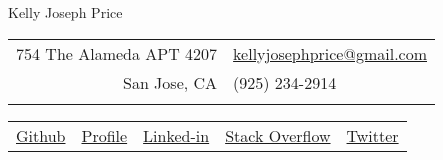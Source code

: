 \documentclass{article}
\begin{document}
\thispagestyle{empty} 

\center \huge{Kelly Joseph Price}
\normalsize

\hspace{.5cm}

{
    \footnotesize
    \centering
    \begin{tabular}{rl}
        754 The Alameda APT 4207\newline
        &
        \href{mailto:kellyjosephprice@gmail.com}{kellyjosephprice@gmail.com}\newline
        \\
        San Jose, CA
        &
        (925) 234-2914
        \\\\
    \end{tabular}
}

\begin{tabularx}{\textwidth}{CCCCC}
    \footnotesize
    \href{https://github.com/kellyjosephprice}{Github}
    &
    \footnotesize
    \href{http://www.klog.io}{Profile}
    &
    \footnotesize
    \href{https://www.linkedin.com/pub/kelly-price/22/760/a11}{Linked-in}
    &
    \footnotesize
    \href{https://careers.stackoverflow.com/kellyjosephprice}{Stack Overflow}
    &
    \footnotesize
    \href{https://twitter.com/kjprice}{Twitter}
\end{tabularx}
\end{document}
